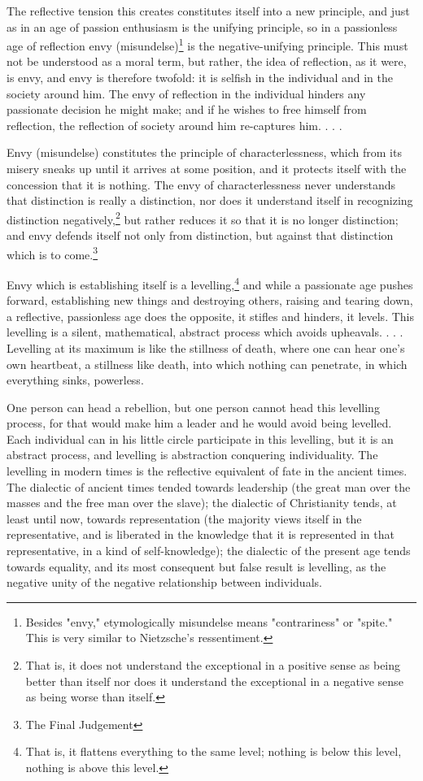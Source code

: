 \documentclass[12pt]{article}
\begin{document}
   The reflective tension this creates constitutes itself into a new
principle, and just as in an age of passion enthusiasm is the unifying
principle, so in a passionless age of reflection envy 
(misundelse)\footnote{Besides "envy," etymologically misundelse means "contrariness" or "spite."
This is very similar to Nietzsche's ressentiment.} is the
negative-unifying principle. This must not be understood as a moral term,
but rather, the idea of reflection, as it were, is envy, and envy is
therefore twofold: it is selfish in the individual and in the society around
him. The envy of reflection in the individual hinders any passionate
decision he might make; and if he wishes to free himself from reflection,
the reflection of society around him re-captures him. . . .

   Envy (misundelse) constitutes the principle of characterlessness,
which from its misery sneaks up until it arrives at some position, and it
protects itself with the concession that it is nothing. The envy of
characterlessness never understands that distinction is really a
distinction, nor does it understand itself in recognizing distinction
negatively,\footnote{That is, it does not understand the exceptional in a positive sense as
being better than itself nor does it understand the exceptional in a
negative sense as being worse than itself.} 
but rather reduces it so that it is no longer distinction; and
envy defends itself not only from distinction, but against that distinction
which is to come.\footnote{The Final Judgement}

   Envy which is establishing itself is a levelling,\footnote{That is, it flattens everything to the same level; nothing is below this
level, nothing is above this level.} and while a
passionate age pushes forward, establishing new things and destroying
others, raising and tearing down, a reflective, passionless age does the
opposite, it stifles and hinders, it levels. This levelling is a silent,
mathematical, abstract process which avoids upheavals. . . . Levelling at
its maximum is like the stillness of death, where one can hear one's own
heartbeat, a stillness like death, into which nothing can penetrate, in
which everything sinks, powerless.

   One person can head a rebellion, but one person cannot head this
levelling process, for that would make him a leader and he would avoid being
levelled. Each individual can in his little circle participate in this
levelling, but it is an abstract process, and levelling is abstraction
conquering individuality. The levelling in modern times is the reflective
equivalent of fate in the ancient times. The dialectic of ancient times
tended towards leadership (the great man over the masses and the free man
over the slave); the dialectic of Christianity tends, at least until now,
towards representation (the majority views itself in the representative, and
is liberated in the knowledge that it is represented in that representative,
in a kind of self-knowledge); the dialectic of the present age tends towards
equality, and its most consequent but false result is levelling, as the
negative unity of the negative relationship between individuals.
\end{document}

